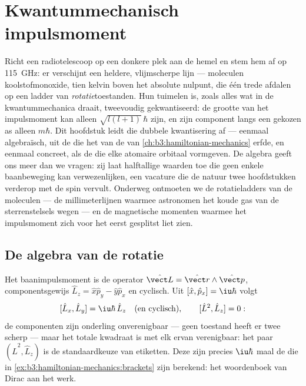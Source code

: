 \chapter{Kwantummechanisch impulsmoment}\label{ch:b3:quantum-angular-momentum}

Richt een radiotelescoop op een donkere plek aan de hemel en stem hem af
op \qty{115}{GHz}: er verschijnt een heldere, vlijmscherpe lijn ---
moleculen koolstofmonoxide, tien kelvin boven het absolute nulpunt, die
één trede afdalen op een ladder van \emph{rotatie}toestanden. Hun tuimelen
is, zoals alles wat in de kwantummechanica draait, tweevoudig
gekwantiseerd: de grootte van het impulsmoment kan alleen
$\sqrt{l(l+1)}\,\hbar$ zijn, en zijn component langs een gekozen as alleen
$m\hbar$. Dit hoofdstuk leidt die dubbele kwantisering af --- eenmaal
algebraïsch, uit de  die het van de  van
\cref{ch:b3:hamiltonian-mechanics} erfde, en eenmaal concreet, als de
 die elke atomaire orbitaal vormgeven. De algebra geeft ons
meer dan we vragen: zij laat halftallige waarden toe die geen enkele
baanbeweging kan verwezenlijken, een vacature die de natuur twee
hoofdstukken verderop met de spin vervult. Onderweg ontmoeten we de
rotatieladders van de moleculen --- de millimeterlijnen waarmee astronomen
het koude gas van de sterrenstelsels wegen --- en de magnetische momenten
waarmee het impulsmoment zich voor het eerst gesplitst liet zien.

\section{De algebra van de rotatie}

\begin{definition}\label{def:b3:quantum-angular-momentum:operators}
Het baanimpulsmoment is de operator $\hat{\vect L} =
\hat{\vect r}\wedge\hat{\vect p}$, componentsgewijs $\hat L_z = \hat
x\hat p_y - \hat y\hat p_x$ en cyclisch. Uit $[\hat x, \hat p_x] =
\iu\hbar$ volgt
\[
[\hat L_x, \hat L_y] = \iu\hbar\,\hat L_z
\quad\text{(en cyclisch)} , \qquad
[\hat L^2, \hat L_z] = 0 :
\]
de componenten zijn onderling onverenigbaar --- geen toestand heeft er
twee scherp --- maar het totale kwadraat is met elk ervan verenigbaar:
het paar $(\hat L^2, \hat L_z)$ is de standaardkeuze van etiketten. Deze
 zijn precies $\iu\hbar$ maal de  die in
\cref{ex:b3:hamiltonian-mechanics:brackets} zijn berekend: het woordenboek
van Dirac aan het werk.
\end{definition}

